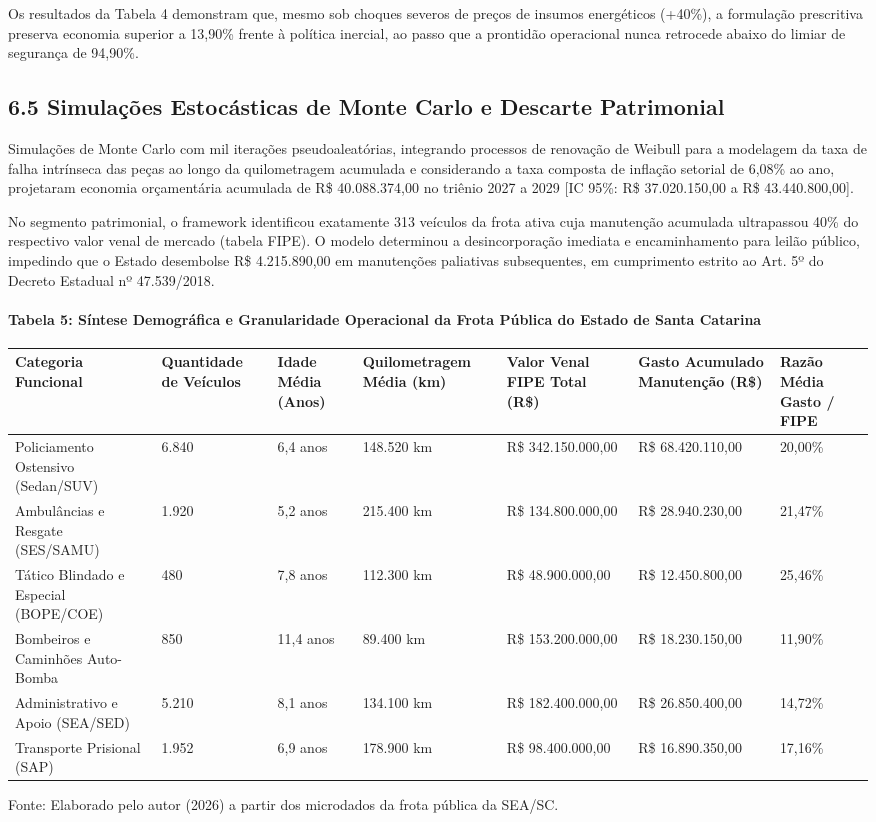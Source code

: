 \documentclass[10pt,a4paper,journal]{article}
\begin{document}
Os resultados da Tabela 4 demonstram que, mesmo sob choques severos de preços de insumos energéticos (+40\%), a formulação prescritiva preserva economia superior a 13,90\% frente à política inercial, ao passo que a prontidão operacional nunca retrocede abaixo do limiar de segurança de 94,90\%.

\subsection{6.5 Simulações Estocásticas de Monte Carlo e Descarte Patrimonial}
Simulações de Monte Carlo com mil iterações pseudoaleatórias, integrando processos de renovação de Weibull para a modelagem da taxa de falha intrínseca das peças ao longo da quilometragem acumulada e considerando a taxa composta de inflação setorial de 6,08\% ao ano, projetaram economia orçamentária acumulada de R\$ 40.088.374,00 no triênio 2027 a 2029 [IC 95\%: R\$ 37.020.150,00 a R\$ 43.440.800,00].

No segmento patrimonial, o framework identificou exatamente 313 veículos da frota ativa cuja manutenção acumulada ultrapassou 40\% do respectivo valor venal de mercado (tabela FIPE). O modelo determinou a desincorporação imediata e encaminhamento para leilão público, impedindo que o Estado desembolse R\$ 4.215.890,00 em manutenções paliativas subsequentes, em cumprimento estrito ao Art. 5º do Decreto Estadual nº 47.539/2018.

\paragraph{Tabela 5: Síntese Demográfica e Granularidade Operacional da Frota Pública do Estado de Santa Catarina}
\begin{table}[htbp]
\centering
\small
\begin{tabular}{lllllll}
\toprule
Categoria Funcional & Quantidade de Veículos & Idade Média (Anos) & Quilometragem Média (km) & Valor Venal FIPE Total (R\$) & Gasto Acumulado Manutenção (R\$) & Razão Média Gasto / FIPE \\
\midrule
Policiamento Ostensivo (Sedan/SUV) & 6.840 & 6,4 anos & 148.520 km & R\$ 342.150.000,00 & R\$ 68.420.110,00 & 20,00\% \\
Ambulâncias e Resgate (SES/SAMU) & 1.920 & 5,2 anos & 215.400 km & R\$ 134.800.000,00 & R\$ 28.940.230,00 & 21,47\% \\
Tático Blindado e Especial (BOPE/COE) & 480 & 7,8 anos & 112.300 km & R\$ 48.900.000,00 & R\$ 12.450.800,00 & 25,46\% \\
Bombeiros e Caminhões Auto-Bomba & 850 & 11,4 anos & 89.400 km & R\$ 153.200.000,00 & R\$ 18.230.150,00 & 11,90\% \\
Administrativo e Apoio (SEA/SED) & 5.210 & 8,1 anos & 134.100 km & R\$ 182.400.000,00 & R\$ 26.850.400,00 & 14,72\% \\
Transporte Prisional (SAP) & 1.952 & 6,9 anos & 178.900 km & R\$ 98.400.000,00 & R\$ 16.890.350,00 & 17,16\% \\
\bottomrule
\end{tabular}
\end{table}
Fonte: Elaborado pelo autor (2026) a partir dos microdados da frota pública da SEA/SC.
\end{document}
